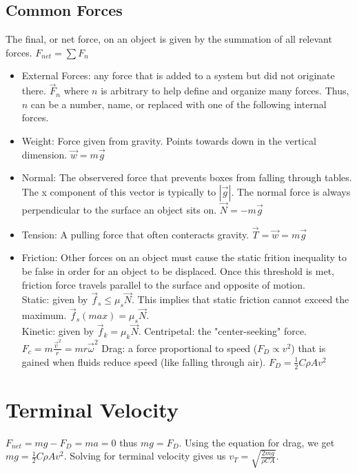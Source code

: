 \documentclass{article}
\begin{document}
\subsection{Common Forces}
The final, or net force, on an object is given by the summation of all relevant forces. $F_{net} = \sum F_n$
\begin{itemize}
  \item External Forces: any force that is added to a system but did not originate there. $\vec{F}_n$ where $n$ is arbitrary to help define and organize many forces. Thus, $n$ can be a number, name, or replaced with one of the following internal forces.
  \item Weight: Force given from gravity. Points towards down in the vertical dimension. $\vec{w} = m\vec{g}$
  \item Normal: The observered force that prevents boxes from falling through tables. The x component of this vector is typically to $|\vec{g}|$. The normal force is always perpendicular to the surface an object sits on. $\vec{N} = -m\vec{g}$
  \item Tension: A pulling force that often conteracts gravity. $\vec{T} = \vec{w} = m\vec{g}$
  \item Friction: Other forces on an object must cause the static frition inequality to be false in order for an object to be displaced. Once this threshold is met, friction force travels parallel to the surface and opposite of motion.\\
  Static: given by $\vec{f}_s \leq \mu_s\vec{N}$. This implies that static friction cannot exceed the maximum. $\vec{f}_s(max) = \mu_s\vec{N}$.\\
  Kinetic: given by $\vec{f}_k = \mu_k\vec{N}$.
  Centripetal: the "center-seeking" force. $F_c = m\frac{\vec{v}^2}{r} = mr\vec{\omega}^2$
  Drag: a force proportional to speed ($F_D \propto v^2$) that is gained when fluids reduce speed (like falling through air). $F_D = \frac{1}{2}C\rho Av^2$
\end{itemize}

\section{Terminal Velocity}
$F_{net} = mg - F_D = ma = 0$ thus $mg = F_D$. Using the equation for drag, we get $mg = \frac{1}{2}C\rho Av^2$. Solving for terminal velocity gives us $v_T = \sqrt{\frac{2mg}{\rho CA}}$.
\end{document}

